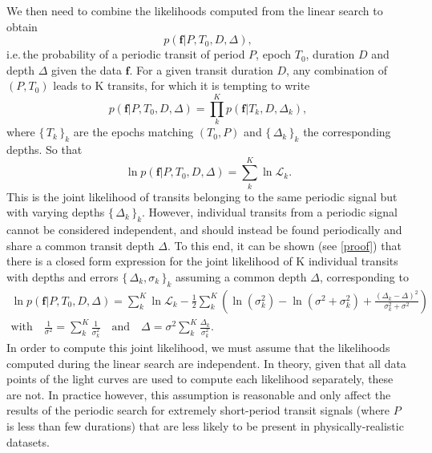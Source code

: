 \documentclass[modern]{aastex631}
\newcommand{\set}[1]{\{\,#1\,\}}
\begin{document}
We then need to combine the likelihoods computed from the linear search to obtain
\begin{equation*}
    p(\bm{f} \vert P, T_0 , D, \Delta),
\end{equation*}
i.e.\,the probability of a periodic transit of period $P$, epoch $T_0$, duration $D$ and depth $\Delta$ given the data $\bm{f}$. For a given transit duration $D$, any combination of $(P, T_0)$ leads to K transits, for which it is tempting to write
\begin{equation}\label{eq:attempt}
    p(\bm{f} \vert P, T_0 ,D, \Delta) = \prod_k^K p(\bm{f} \vert T_k, D, \Delta_k),
\end{equation}
where $\set{T_k}_k$ are the epochs matching $(T_0, P)$ and $\set{\Delta_k}_k$ the corresponding depths. So that
\begin{equation*}
    \ln p(\bm{f} \vert P, T_0 ,D, \Delta) = \sum_k^K \ln \mathcal{L}_k.
\end{equation*}
This is the joint likelihood of transits belonging to the same periodic signal but with varying depths  $\set{\Delta_k}_k$. However, individual transits from a periodic signal cannot be considered independent, and should instead be found periodically and share a common transit depth $\Delta$. To this end, it can be shown (see \autoref{proof}) that there is a closed form expression for the joint likelihood of K individual transits with depths and errors $\set{\Delta_k, \sigma_k}_k$ assuming a common depth $\Delta$, corresponding to 
\begin{equation}\label{eq:result}
    \begin{gathered}
        \ln p(\bm{f} \vert P, T_0 ,D, \Delta) =  \sum_{k}^K \ln \mathcal{L}_k  - \frac{1}{2} \sum_k^K\left(\ln(\sigma_{k}^2) - \ln(\sigma^{2} + \sigma_{k}^{2}) +  \frac{\left(\Delta_{k} -
        \Delta\right)^{2}}{\sigma_k^{2} + \sigma^{2}}\right) \\
        \text{with} \quad  \frac{1}{\sigma^2} = \sum_k^K \frac{1}{\sigma_k^2} \quad \text{and} \quad
        \Delta = \sigma^2 \sum_k^K {\frac{\Delta_k}{\sigma_k^2}}.
    \end{gathered}
\end{equation}
In order to compute this joint likelihood, we must assume that the likelihoods computed during the linear search are independent. In theory, given that all data points of the light curves are used to compute each likelihood separately, these are not. In practice however, this assumption is reasonable and only affect the results of the periodic search for extremely short-period transit signals (where $P$ is less than few durations) that are less likely to be present in physically-realistic datasets.\\\\
\end{document}
